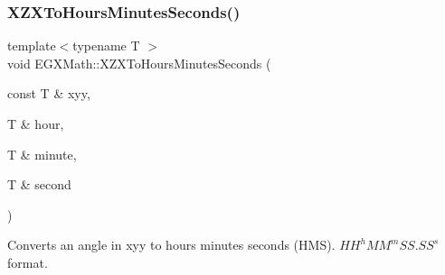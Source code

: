 \subsubsection{\texorpdfstring{X\+Z\+X\+To\+Hours\+Minutes\+Seconds()}{XZXToHoursMinutesSeconds()}}
{\footnotesize\ttfamily template$<$typename T $>$ \\
void E\+G\+X\+Math\+::\+X\+Z\+X\+To\+Hours\+Minutes\+Seconds (\begin{DoxyParamCaption}\item[{const T \&}]{xyy,  }\item[{T \&}]{hour,  }\item[{T \&}]{minute,  }\item[{T \&}]{second }\end{DoxyParamCaption})}



Converts an angle in xyy to hours minutes seconds (H\+MS). ${HH}^h{MM}^m{SS.SS}^s$ format. 


